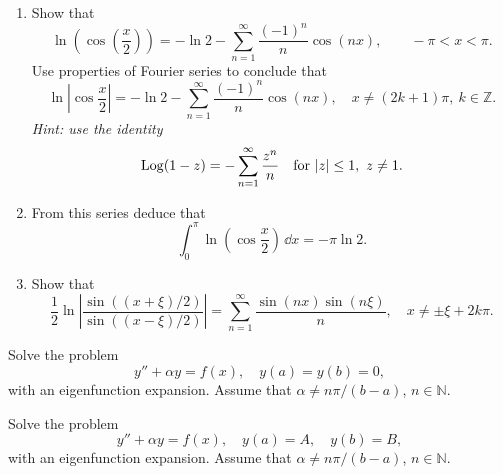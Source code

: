 {%
\begin{Exercise}
  \begin{enumerate}
  \item
    Show that 
    \[
    \ln \left( \cos \left( \frac{x}{2}\right) \right) = - \ln 2 
    - \sum_{n = 1}^\infty \frac{(-1)^n}{n} \cos(n x), \qquad -\pi < x < \pi.
    \]
    Use properties of Fourier series to conclude that
    \[
    \ln \left| \cos \frac{x}{2} \right| = - \ln 2 
    - \sum_{n = 1}^\infty \frac{ (-1)^n }{ n } \cos(n x), 
    \quad x \neq (2 k + 1) \pi,\ k \in \mathbb{Z}.
    \]
    \textit{Hint: use the identity}
    \[
    \mathop{\mathrm{Log}}\nolimits(1 - z) = - \sum_{n = 1}^\infty \frac{z^n}{n} \quad 
    \mathrm{for}\ |z| \leq 1, ~ z \neq 1.
    \]
  \item
    From this series deduce that 
    \[
    \int_0^\pi \ln \left( \cos \frac{x}{2} \right) \,\dd x = - \pi \ln 2.
    \]
  \item
    Show that
    \[
    \frac{1}{2} \ln \left| \frac{ \sin((x+\xi)/2) }{ \sin((x-\xi)/2) } \right|
    = \sum_{n = 1}^\infty \frac{ \sin(n x) \sin(n \xi) }{ n }, \quad
    x \neq \pm \xi + 2 k \pi.
    \]
  \end{enumerate}
\end{Exercise}









\begin{Exercise}
  Solve the problem 
  \[
  y'' + \alpha y = f(x), \quad y(a) = y(b) = 0,
  \]
  with an eigenfunction expansion.  Assume that $\alpha \neq n \pi / (b-a)$,
  $n \in \mathbb{N}$.
\end{Exercise}



\begin{Exercise}
  Solve the problem 
  \[
  y'' + \alpha y = f(x), \quad y(a) = A, \quad y(b) = B,
  \]
  with an eigenfunction expansion.  Assume that $\alpha \neq n \pi / (b-a)$,
  $n \in \mathbb{N}$.
\end{Exercise}








}
